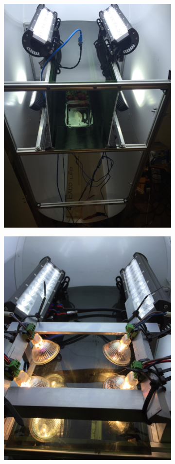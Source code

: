 \documentclass[fleqn,twoside]{article}
\begin{document}
\begin{figure}[h]
	\begin{subfigure}{.35\textwidth}
		\centering
		\includegraphics[width=.9\linewidth,angle=270,origin=c]{bench_led_rigid.jpg}
		\caption{}
		\label{fig:bench_led_rigid}
	\end{subfigure}%
	\begin{subfigure}{.35\textwidth}
		\centering
		\includegraphics[width=.9\linewidth,angle=270,origin=c]{images/production_LED_Hal.jpg}

\end{subfigure}
\end{figure}
\end{document}
